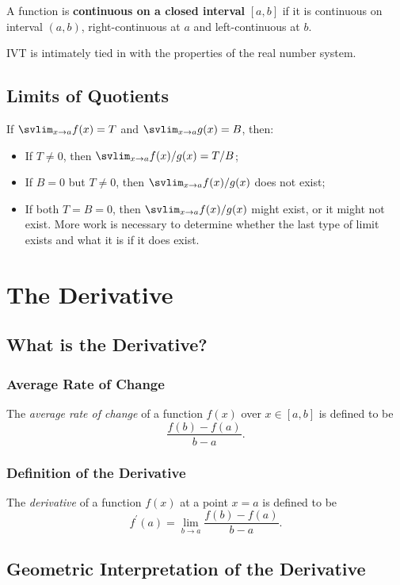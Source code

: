 \begin{definition}
  A function is \textbf{continuous on a closed interval} $\left[a,b\right]$ if it is continuous on interval $\left(a,b\right)$, right-continuous at $a$ and left-continuous at $b$.
\end{definition}
\begin{note}IVT is intimately tied in with the properties of the real number system.\end{note}


\section{Limits of Quotients}
If $\svlim_{x\to a}f(x)=T$ and $\svlim_{x\to a}g(x)=B$, then:
\begin{itemize}
\item If $T\neq0$, then $\svlim_{x\to a}f(x)/g(x)=T/B$;
\item If $B=0$ but $T\neq0$, then $\svlim_{x\to a}f(x)/g(x)$ does not exist;
\item If both $T=B=0$, then $\svlim_{x\to a}f(x)/g(x)$ might exist, or it might not exist. More work is necessary to determine whether the last type of limit exists and what it is if it does exist.
\end{itemize}



\chapter{The Derivative}
\section{What is the Derivative?}
\subsection{Average Rate of Change}
The \textit{average rate of change} of a function $f(x)$ over $x\in\left[a,b\right]$ is defined to be
\[\frac{f(b)-f(a)}{b-a}.\]

\subsection{Definition of the Derivative}
The \textit{derivative} of a function $f(x)$ at a point $x=a$ is defined to be
\[f^\prime(a)=\lim_{b\to a}\frac{f(b)-f(a)}{b-a}.\]


\section{Geometric Interpretation of the Derivative}
